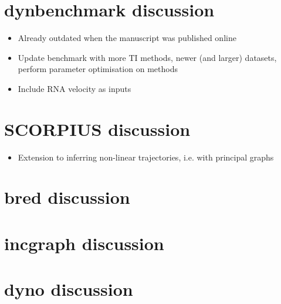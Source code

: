 \section{dynbenchmark discussion}
\begin{itemize}
	\item Already outdated when the manuscript was published online
	\item Update benchmark with more TI methods, newer (and larger) datasets, perform parameter optimisation on methods
	\item Include RNA velocity as inputs
\end{itemize}

\section{SCORPIUS discussion}
\begin{itemize}
	\item Extension to inferring non-linear trajectories, i.e. with principal graphs
\end{itemize}

\section{bred discussion}

\section{incgraph discussion}

\section{dyno discussion}

